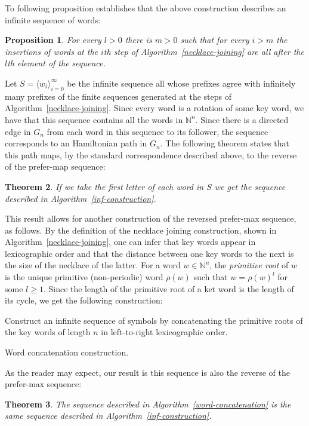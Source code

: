 \documentclass{article}
\newtheorem{theorem}{Theorem}
\newtheorem{proposition}[theorem]{Proposition}
\theoremstyle{definition}
\newcommand{\N}{{\mathbb{N}}}
\newcommand{\T}[1]{\langle{#1}\rangle}
\begin{document}
To following proposition establishes that the above construction describes an infinite sequence of words:

\begin{proposition}
	For every $l>0$ there is $m>0$ such that for every $i>m$ the insertions of words at the $i$th step of Algorithm~\ref{necklace-joining} are all after the $l$th element of the sequence.
\end{proposition}

Let $S=\T{w_i}_{i=0}^\infty$ be the infinite sequence all whose prefixes agree with infinitely many prefixes of the finite sequences generated at the steps of Algorithm~\ref{necklace-joining}. Since every word is a rotation of some key word, we have that this sequence contains all the words in $\N^n$. Since there is a directed edge in $G_n$ from each word in this sequence to its follower, the sequence corresponds to an Hamiltonian path in $G_n$. The following theorem states that this path maps, by the standard correspondence described above, to the reverse of the prefer-map sequence:

\begin{theorem}
	If we take the first letter of each word in $S$ we get the sequence described in Algorithm~\ref{inf-construction}.
\end{theorem}

This result allows for another construction of the reversed prefer-max sequence, as follows. By the definition of the necklace joining construction, shown in Algorithm~\ref{necklace-joining}, one can infer that key words appear in lexicographic order and that the distance between one key words to the next is the size of the necklace of the latter. For a word $w\in\N^n$, the \emph{primitive root} of $w$ is the  unique primitive (non-periodic) word $\rho(w)$ such that $w = \rho(w)^l$ for some $l \geq 1$. Since the length of the primitive root of a ket word is the length of its cycle, we get the following construction:


\begin{algorithm}[!h]
	Construct an infinite sequence of symbols by concatenating the primitive roots  of the key words of length $n$ in left-to-right lexicographic order.
	\caption{Word concatenation construction.}
	\label{word-concatenation}
\end{algorithm}

As the reader may expect, our result is this sequence is also the reverse of the prefer-max sequence:

\begin{theorem}
	The sequence described in Algorithm~\ref{word-concatenation} is the same sequence described in Algorithm~\ref{inf-construction}.
\end{theorem}
\end{document}
